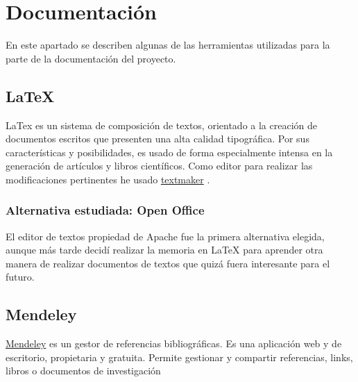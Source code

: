 
\section{Documentación}\label{docs}
En este apartado se describen algunas de las herramientas utilizadas para la parte de la documentación del proyecto.

 \subsection{LaTeX}\label{latex}
  LaTex es un sistema de composición de textos, orientado a la creación de documentos escritos que presenten una alta calidad tipográfica. Por sus características y posibilidades, es usado de forma especialmente intensa en la generación de artículos y libros científicos. Como editor para realizar las modificaciones pertinentes he usado \hyperlink{http://www.xm1math.net/texmaker/}{textmaker} .
  
 
 \subsubsection{Alternativa estudiada: Open Office}\label{openoffice}
El editor de textos propiedad de Apache fue la primera alternativa elegida, aunque más tarde decidí realizar la memoria en LaTeX para aprender otra manera de realizar documentos de textos que quizá fuera interesante para el futuro.

 \subsection{Mendeley}\label{mendeley}
  \hyperlink{www.mendeley.com/}{Mendeley} es un gestor de referencias bibliográficas. Es una aplicación web y de escritorio, propietaria y gratuita. Permite gestionar y compartir referencias, links, libros o documentos de investigación




